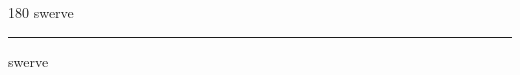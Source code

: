 
\begin{frame}
\begin{center}
\begin{turn}{180}
{\fontsize{2.5cm}{1em}\selectfont swerve}
\end{turn}
\vspace{1em}\par  
\hrule
\vspace{1em}\par  
{\fontsize{2.5cm}{1em}\selectfont swerve}
\end{center}
\end{frame}
